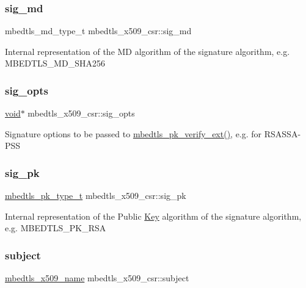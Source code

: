 \subsubsection{\texorpdfstring{sig\+\_\+md}{sig\_md}}
{\footnotesize\ttfamily mbedtls\+\_\+md\+\_\+type\+\_\+t mbedtls\+\_\+x509\+\_\+csr\+::sig\+\_\+md}

Internal representation of the MD algorithm of the signature algorithm, e.\+g. M\+B\+E\+D\+T\+L\+S\+\_\+\+M\+D\+\_\+\+S\+H\+A256 \mbox{\label{structmbedtls__x509__csr_ac1152e686c27158c211b2c3fdfaefdb7}} 
\subsubsection{\texorpdfstring{sig\+\_\+opts}{sig\_opts}}
{\footnotesize\ttfamily \hyperlink{interfacevoid}{void}$\ast$ mbedtls\+\_\+x509\+\_\+csr\+::sig\+\_\+opts}

Signature options to be passed to \hyperlink{pk_8h_a81f0c5e40b839f5eca676c2c2752036f}{mbedtls\+\_\+pk\+\_\+verify\+\_\+ext()}, e.\+g. for R\+S\+A\+S\+S\+A-\/\+P\+SS \mbox{\label{structmbedtls__x509__csr_a670fac5f5b5cd7398e1b241dc257bc97}} 
\subsubsection{\texorpdfstring{sig\+\_\+pk}{sig\_pk}}
{\footnotesize\ttfamily \hyperlink{pk_8h_a3fe41eff5605ae727eb9d28dad297020}{mbedtls\+\_\+pk\+\_\+type\+\_\+t} mbedtls\+\_\+x509\+\_\+csr\+::sig\+\_\+pk}

Internal representation of the Public \hyperlink{struct_key}{Key} algorithm of the signature algorithm, e.\+g. M\+B\+E\+D\+T\+L\+S\+\_\+\+P\+K\+\_\+\+R\+SA \mbox{\label{structmbedtls__x509__csr_a0c403df635495f8cba9b3e1001fc4491}} 
\subsubsection{\texorpdfstring{subject}{subject}}
{\footnotesize\ttfamily \hyperlink{group__x509__module_ga2272228c7776102328df31623af3168c}{mbedtls\+\_\+x509\+\_\+name} mbedtls\+\_\+x509\+\_\+csr\+::subject}

